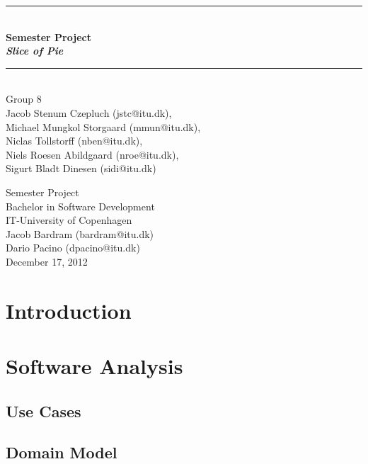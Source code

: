 \documentclass[a4paper,11pt]{article}
\begin{document}
\begin{titlepage}
\centering \parindent=0pt
\newcommand{\HRule}{\rule{\textwidth}{1mm}}
 \HRule\\[1cm]\Huge\bfseries
Semester Project\\\emph{Slice of Pie}\\[0.7cm]
\HRule\\[4cm]  \large Group 8
\\Jacob Stenum Czepluch (jstc@itu.dk), 
\\Michael Mungkol Storgaard (mmun@itu.dk),
\\Niclas Tollstorff (nben@itu.dk), 
\\Niels Roesen Abildgaard (nroe@itu.dk), 
\\Sigurt Bladt Dinesen (sidi@itu.dk) \\

 \normalsize %
\begin{flushleft}
Semester Project\\
Bachelor in Software Development\\
IT-University of Copenhagen\\
Jacob Bardram (bardram@itu.dk)\\
Dario Pacino (dpacino@itu.dk) \\
December 17, 2012 \end{flushleft}
\end{titlepage}

\tableofcontents
\pagebreak

\pagebreak
\section{Introduction}


\pagebreak

\pagebreak
\section{Software Analysis}


\subsection{Use Cases}


\subsection{Domain Model}

\end{document}
